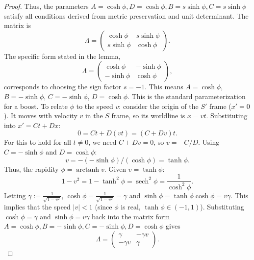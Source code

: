 \documentclass{amsart}
\theoremstyle{definition}
\theoremstyle{remark}
\DeclareMathOperator{\arctanh}{arctanh}
\DeclareMathOperator{\sech}{sech}
\begin{document}
\begin{proof}
  Thus, the parameters $A=\cosh\phi, D=\cosh\phi, B=s\sinh\phi, C=s\sinh\phi$ satisfy all conditions derived from metric preservation and unit determinant.
  The matrix is
  \begin{equation*}
    \Lambda =
    \begin{pmatrix}
      \cosh\phi & s\sinh\phi \\
      s\sinh\phi & \cosh\phi
    \end{pmatrix}.
  \end{equation*}
  The specific form stated in the lemma,
  \begin{equation*}
    \Lambda =
    \begin{pmatrix}
      \cosh\phi & -\sinh\phi \\
      -\sinh\phi & \cosh\phi
    \end{pmatrix},
  \end{equation*}
  corresponds to choosing the sign factor $s=-1$.
  This means $A = \cosh\phi$, $B = -\sinh\phi$, $C = -\sinh\phi$, $D = \cosh\phi$. This is the standard parameterization for a boost. To relate $\phi$ to the speed $v$: consider the origin of the $S'$ frame ($x'=0$). It moves with velocity $v$ in the $S$ frame, so its worldline is $x=vt$.
  Substituting into $x' = C t + D x$:
  \begin{equation*}
    0 = C t + D (vt) = (C + Dv)t.
  \end{equation*}
  For this to hold for all $t \neq 0$, we need $C+Dv=0$, so $v = -C/D$.
  Using $C = -\sinh\phi$ and $D = \cosh\phi$:
  \begin{equation*}
    v = -(-\sinh\phi) / (\cosh\phi) = \tanh\phi.
  \end{equation*}
  Thus, the rapidity $\phi = \arctanh v$. Given $v = \tanh\phi$:
  \begin{equation*}
    1 - v^2 = 1 - \tanh^2\phi = \sech^2\phi = \frac{1}{\cosh^2\phi}.
  \end{equation*}
  Letting $\gamma:=\frac{1}{\sqrt{1-v^2}}$, $\cosh\phi = \frac{1}{\sqrt{1-v^2}}=\gamma$ and $\sinh\phi = \tanh\phi \cosh\phi = v\gamma$.
  This implies that the speed $|v| < 1$ (since $\phi$ is real, $\tanh\phi \in (-1,1)$).
  Substituting $\cosh\phi = \gamma$ and $\sinh\phi = v\gamma$ back into the matrix form $A=\cosh\phi, B=-\sinh\phi, C=-\sinh\phi, D=\cosh\phi$ gives
  \begin{equation*}
    \Lambda =
    \begin{pmatrix}
      \gamma & -\gamma v \\
      -\gamma v & \gamma
    \end{pmatrix}.
  \end{equation*}
\end{proof}
\end{document}
